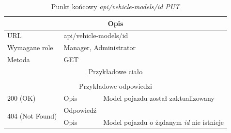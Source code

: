 \documentclass[eng,printmode,openany]{mgr}
\begin{document}
\begin{table}[]
	\caption{Punkt końcowy \textit{api/vehicle-models/id PUT}}
	\begin{tabularx}{\textwidth}{|l|l|X|}
		\hline
		\multicolumn{3}{|c|}{Opis}                         						\\ \hline
		URL                       & \multicolumn{2}{l|}{api/vehicle-models/id} 	\\ \hline
		Wymagane role             & \multicolumn{2}{l|}{Manager, Administrator} \\ \hline

		Metoda                    & \multicolumn{2}{l|}{GET} 					\\ \hline
		\multicolumn{3}{|c|}{Przykładowe ciało}         						\\ \hline
		\multicolumn{3}{|c|}{} 						\\ \hline
		\multicolumn{3}{|c|}{Przykładowe odpowiedzi}                   		\\ \hline
		200 (OK)			& Opis         	& Model pojazdu został zaktualizowany 									\\ \hline
				\multirow{2}{*}{404 (Not Found)} 	& Odpowiedź     &      \\ \cline{2-3} 
		& Opis          & Model pojazdu o żądanym \textit{id} nie istnieje  									\\ \hline
	\end{tabularx}
\end{table}
\end{document}
